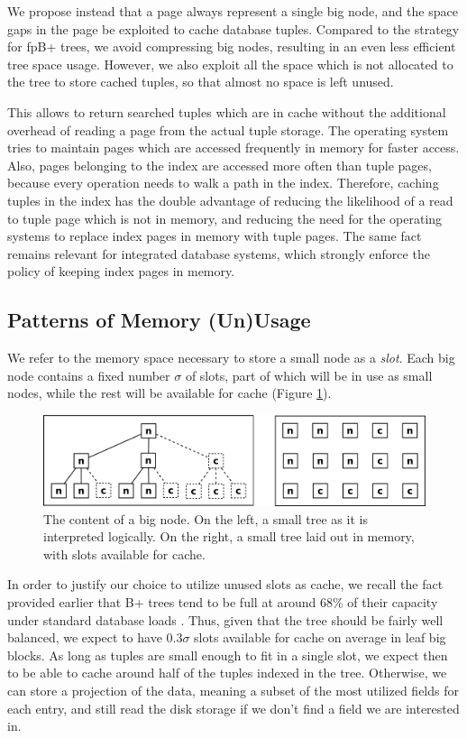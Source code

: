 \documentclass{article}
\begin{document}
We propose instead that a page always represent a single big node, and the space
gaps in the page
be exploited to cache database tuples.
Compared to the strategy for fpB+ trees, we avoid compressing big nodes,
resulting in an
even less efficient tree space usage.
However, we also exploit all the space which is not allocated to the tree to
store cached tuples,
so that almost no space is left unused.

This allows to return searched tuples which are in cache without the additional
overhead of reading a page from
the actual tuple storage.
The operating system tries to maintain pages which are accessed frequently in
memory for faster
access.
Also, pages belonging to the index are accessed more often than tuple pages,
because every operation
needs to walk a path in the index.
Therefore, caching tuples in the index has the double advantage of reducing the
likelihood
of a read to tuple page which is not in memory, and reducing the need for the
operating systems
to replace index pages in memory with tuple pages.
The same fact remains relevant for integrated database systems, which strongly
enforce the policy of keeping
index pages in memory.


\subsection{Patterns of Memory (Un)Usage}
We refer to the memory space necessary to store a small node as a \textit{slot}.
Each big node contains a fixed number $\sigma$ of slots, part of which will be
in use
as small nodes, while the rest will be available for cache (Figure
\ref{fig:inner_block}).
\begin{figure}[h]
\begin{center}
\includegraphics[width=350pt]{inner_block}
\end{center}
\caption{
The content of a big node.
On the left, a small tree as it is interpreted logically.
On the right, a small tree laid out in memory, with slots available for cache.
}
\label{fig:inner_block}
\end{figure}

In order to justify our choice to utilize unused slots as cache,
we recall the fact provided earlier that
B+ trees tend to be full at around 68\% of their capacity under standard
database loads \citep{Wu:2011}.
Thus, given that the tree should be fairly well balanced,
we expect to have $0.3 \sigma$ slots available for cache on average in leaf big
blocks.
As long as tuples are small enough to fit in a single slot,
we expect then to be able to cache around half of the tuples indexed in the
tree.
Otherwise, we can store a projection of the data, meaning a subset of the most
utilized fields for each entry,
and still read the disk storage if we don't find a field we are interested in.
\end{document}

